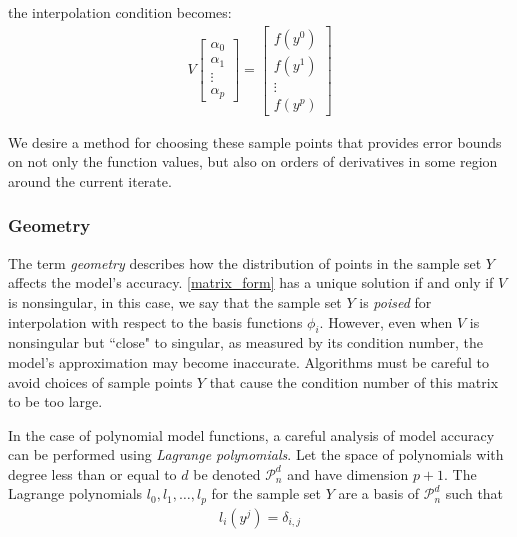 \documentclass{article}
\theoremstyle{case}
\newcommand{\polydn}{\mathcal{P}^d_n}
\begin{document}
the interpolation condition becomes:
\begin{align}
\label{matrix_form}
V
\begin{bmatrix}
    \alpha_0     \\
    \alpha_1     \\
    \vdots       \\
    \alpha_p
\end{bmatrix}
=
\begin{bmatrix}
    f(y^0)     \\
    f(y^1)     \\
    \vdots     \\
    f(y^p)
\end{bmatrix}
\end{align}

We desire a method for choosing these sample points that provides error bounds on not only the function values, but also on orders of derivatives in some region around the current iterate.



\subsubsection{Geometry}
\label{geometry}
The term \emph{geometry} describes how the distribution of points in the sample set $Y$ affects the model's accuracy.
\cref{matrix_form} has a unique solution if and only if $V$ is nonsingular, in this case, we say that the sample set $Y$ is \emph{poised} for interpolation with respect to the basis functions $\phi_i$.
However, even when $V$ is nonsingular but ``close" to singular, as measured by its condition number, the model's approximation may become inaccurate.
Algorithms must be careful to avoid choices of sample points $Y$ that cause the condition number of this matrix to be too large.

In the case of polynomial model functions, a careful analysis of model accuracy can be performed using \emph{Lagrange polynomials}.
Let the space of polynomials with degree less than or equal to $d$ be denoted $\polydn$ and have dimension $p+1$.
The Lagrange polynomials $l_0, l_1, \ldots, l_p$ for the sample set $Y$ are a basis of $\polydn$ such that
\begin{align*}
l_i(y^j) = \delta_{i,j}
\end{align*}
\end{document}
